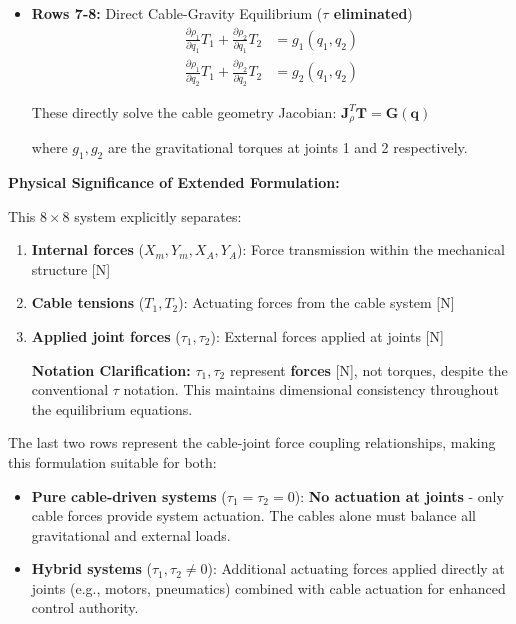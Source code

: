 \begin{itemize}
    \item \textbf{Rows 7-8:} Direct Cable-Gravity Equilibrium (\textbf{$\tau$ eliminated})
    \begin{align}
    \frac{\partial \rho_1}{\partial q_1} T_1 + \frac{\partial \rho_2}{\partial q_1} T_2 &= g_1(q_1, q_2) \\
    \frac{\partial \rho_1}{\partial q_2} T_1 + \frac{\partial \rho_2}{\partial q_2} T_2 &= g_2(q_1, q_2)
    \end{align}
    
    These directly solve the cable geometry Jacobian: $\mathbf{J}_{\rho}^T \mathbf{T} = \mathbf{G}(\mathbf{q})$
    
    where $g_1, g_2$ are the gravitational torques at joints 1 and 2 respectively.
\end{itemize}

\textbf{Physical Significance of Extended Formulation:}

This $8 \times 8$ system explicitly separates:
\begin{enumerate}
    \item \textbf{Internal forces} ($X_m, Y_m, X_A, Y_A$): Force transmission within the mechanical structure [N]
    \item \textbf{Cable tensions} ($T_1, T_2$): Actuating forces from the cable system [N]
    \item \textbf{Applied joint forces} ($\tau_1, \tau_2$): External forces applied at joints [N]
    
    \textbf{Notation Clarification:} $\tau_1, \tau_2$ represent \textbf{forces} [N], not torques, despite the conventional $\tau$ notation. This maintains dimensional consistency throughout the equilibrium equations.
\end{enumerate}

The last two rows represent the cable-joint force coupling relationships, making this formulation suitable for both:
\begin{itemize}
    \item \textbf{Pure cable-driven systems} ($\tau_1 = \tau_2 = 0$): \textbf{No actuation at joints} - only cable forces provide system actuation. The cables alone must balance all gravitational and external loads.
    \item \textbf{Hybrid systems} ($\tau_1, \tau_2 \neq 0$): Additional actuating forces applied directly at joints (e.g., motors, pneumatics) combined with cable actuation for enhanced control authority.
\end{itemize}

